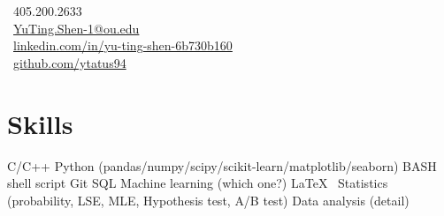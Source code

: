 \documentclass[letterpaper]{deedy-resume-openfont}
\begin{document}
%
%
\lastupdated

%
%

{
    \faPhone \ 405.200.2633\\
    \faEnvelope \ \href{mailto:YuTing.Shen-1@ou.edu}{YuTing.Shen-1@ou.edu}\\
    \faLinkedinSquare \ \href{https://www.linkedin.com/in/yu-ting-shen-6b730b160/}{linkedin.com/in/yu-ting-shen-6b730b160}\\
    \faGithub \ \href{https://github.com/ytatus94}{github.com/ytatus94}
}




\section{Skills}
\raggedright{
	C/C++ \textbullet{}
	Python (pandas/numpy/scipy/scikit-learn/matplotlib/seaborn) \textbullet{}
	BASH shell script \textbullet{}
	Git \textbullet{}
	SQL \textbullet{}
	Machine learning (which one?) \textbullet{} 
	\LaTeX\ \textbullet{}
	Statistics (probability, LSE, MLE, Hypothesis test, A/B test) \textbullet{}
	Data analysis (detail) \textbullet{}
}
\sectionsep
\end{document}
